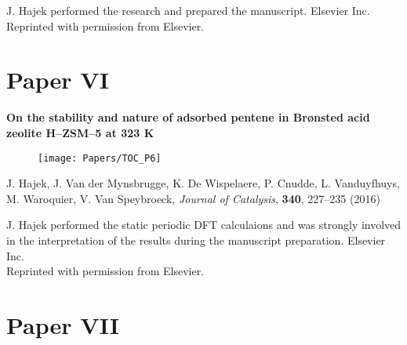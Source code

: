 \vfill
\noindent J. Hajek performed the research and prepared the manuscript.
\npar
\noindent {} Elsevier Inc. \\
Reprinted with permission from Elsevier.

\clearpage{\pagestyle{empty}\cleardoublepage}

 

\clearpage{\pagestyle{empty}\cleardoublepage}



\section*{Paper VI}

\vspace{0.1\textheight}
{
\large
\textbf{On the stability and nature of
adsorbed pentene in Br\o{}nsted acid zeolite H--ZSM--5 at 323 K} }
\begin{figure}[h!]
	\centering
	\texttt{[image: Papers/TOC\_P6]}
\end{figure}
 
\noindent
J. Hajek, J. Van der Mynsbrugge, K. De Wispelaere, P. Cnudde, L. Vanduyfhuys, M.
Waroquier, V. Van Speybroeck, \textit{Journal of Catalysis}, \textbf{340},
227--235 (2016)
\npar


\vfill
\noindent J. Hajek performed the static periodic DFT calculaions and
 was strongly involved in the interpretation of the results during the manuscript preparation.
\npar
\noindent {} Elsevier Inc. \\
Reprinted with permission from Elsevier.

\clearpage{\pagestyle{empty}\cleardoublepage}

 

\clearpage{\pagestyle{empty}\cleardoublepage}




\section*{Paper VII}

